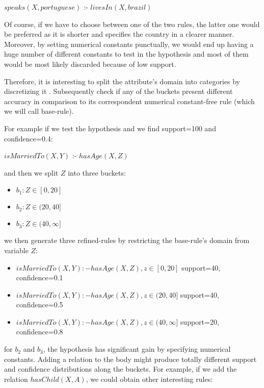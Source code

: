 \begin{center}
 $speaks(X,portuguese)$ :- $livesIn(X,brazil)$
\end{center}

Of course, if we have to choose between one of the two rules, the latter one would be preferred as it is shorter and
specifies the country in a clearer manner. Moreover, by setting numerical constants punctually, we would end up having a
huge number of different constants to test in the hypothesis and most of them would be most likely discarded because of
low support.

Therefore, it is interesting to split the attribute's domain into categories by discretizing it .
Subsequently check if any of the buckets present different accuracy in comparison to its correspondent numerical
constant-free rule (which we will call base-rule).

For example if we test the hypothesis and we find support=100 and confidence=0.4:

\begin{center}
 $isMarriedTo(X,Y)$ :- $hasAge(X,Z)$ 
\end{center}

and then we split $Z$ into three buckets:

\begin{itemize}
 \item $ b_1: Z\in[0,20]$
 \item $ b_2: Z\in(20,40]$
 \item $ b_3: Z\in(40,\infty]$
\end{itemize}

we then generate three refined-rules by restricting the base-rule's domain from variable $Z$:

\begin{itemize}

 \item $isMarriedTo(X,Y) :- hasAge(X,Z), z\in[0,20]$	
    \newline support=40, confidence=0.1
 \item $isMarriedTo(X,Y) :- hasAge(X,Z), z\in(20,40]$	
    \newline support=40, confidence=0.5
 \item $isMarriedTo(X,Y) :- hasAge(X,Z), z\in(40,\infty]$
    \newline support=20, confidence=0.8

\end{itemize}

for $b_2$ and $b_3$, the hypothesis has significant gain by specifying numerical constants. Adding a relation to the
body might produce totally different support and confidence distributions along the buckets. For example, if we add the
relation $hasChild(X,A)$, we could obtain other interesting rules:

